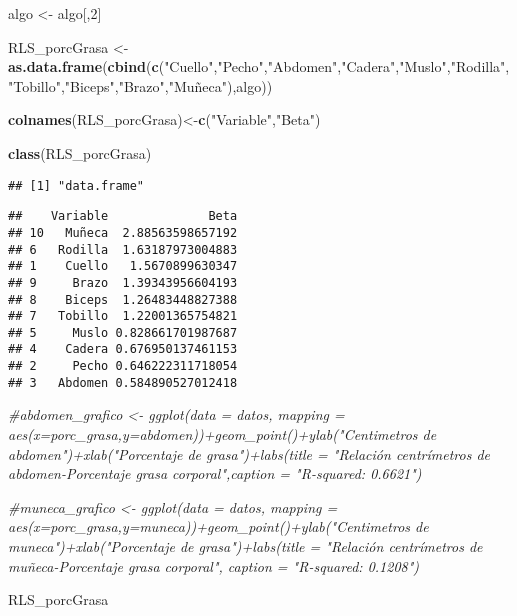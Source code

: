 \documentclass[
]{article}
\newenvironment{Shaded}{\begin{snugshade}}{\end{snugshade}}
\newcommand{\AttributeTok}[1]{\textcolor[rgb]{0.13,0.29,0.53}{#1}}
\newcommand{\CommentTok}[1]{\textcolor[rgb]{0.56,0.35,0.01}{\textit{#1}}}
\newcommand{\DecValTok}[1]{\textcolor[rgb]{0.00,0.00,0.81}{#1}}
\newcommand{\FunctionTok}[1]{\textcolor[rgb]{0.13,0.29,0.53}{\textbf{#1}}}
\newcommand{\NormalTok}[1]{#1}
\newcommand{\OtherTok}[1]{\textcolor[rgb]{0.56,0.35,0.01}{#1}}
\newcommand{\SpecialCharTok}[1]{\textcolor[rgb]{0.81,0.36,0.00}{\textbf{#1}}}
\newcommand{\StringTok}[1]{\textcolor[rgb]{0.31,0.60,0.02}{#1}}
\begin{document}
\begin{Shaded}
\begin{Highlighting}[]
\NormalTok{algo }\OtherTok{\textless{}{-}}\NormalTok{ algo[,}\DecValTok{2}\NormalTok{]}

\NormalTok{RLS\_porcGrasa }\OtherTok{\textless{}{-}} \FunctionTok{as.data.frame}\NormalTok{(}\FunctionTok{cbind}\NormalTok{(}\FunctionTok{c}\NormalTok{(}\StringTok{"Cuello"}\NormalTok{,}\StringTok{"Pecho"}\NormalTok{,}\StringTok{"Abdomen"}\NormalTok{,}\StringTok{"Cadera"}\NormalTok{,}\StringTok{"Muslo"}\NormalTok{,}\StringTok{"Rodilla"}\NormalTok{,}\StringTok{"Tobillo"}\NormalTok{,}\StringTok{"Biceps"}\NormalTok{,}\StringTok{"Brazo"}\NormalTok{,}\StringTok{"Muñeca"}\NormalTok{),algo))}

\FunctionTok{colnames}\NormalTok{(RLS\_porcGrasa)}\OtherTok{\textless{}{-}}\FunctionTok{c}\NormalTok{(}\StringTok{"Variable"}\NormalTok{,}\StringTok{"Beta"}\NormalTok{)}

\FunctionTok{class}\NormalTok{(RLS\_porcGrasa)}
\end{Highlighting}
\end{Shaded}

\begin{verbatim}
## [1] "data.frame"
\end{verbatim}

\begin{Shaded}
\end{Shaded}

\begin{verbatim}
##    Variable              Beta
## 10   Muñeca  2.88563598657192
## 6   Rodilla  1.63187973004883
## 1    Cuello   1.5670899630347
## 9     Brazo  1.39343956604193
## 8    Biceps  1.26483448827388
## 7   Tobillo  1.22001365754821
## 5     Muslo 0.828661701987687
## 4    Cadera 0.676950137461153
## 2     Pecho 0.646222311718054
## 3   Abdomen 0.584890527012418
\end{verbatim}

\begin{Shaded}
\begin{Highlighting}[]
\CommentTok{\#abdomen\_grafico \textless{}{-} ggplot(data = datos, mapping = aes(x=porc\_grasa,y=abdomen))+geom\_point()+ylab("Centimetros de abdomen")+xlab("Porcentaje de grasa")+labs(title = "Relación centrímetros de abdomen{-}Porcentaje grasa corporal",caption = "R{-}squared:  0.6621")}


\CommentTok{\#muneca\_grafico \textless{}{-} ggplot(data = datos, mapping = aes(x=porc\_grasa,y=muneca))+geom\_point()+ylab("Centimetros de muneca")+xlab("Porcentaje de grasa")+labs(title = "Relación centrímetros de muñeca{-}Porcentaje grasa corporal", caption = "R{-}squared:  0.1208")}


\NormalTok{RLS\_porcGrasa}
\end{Highlighting}
\end{Shaded}
\end{document}
